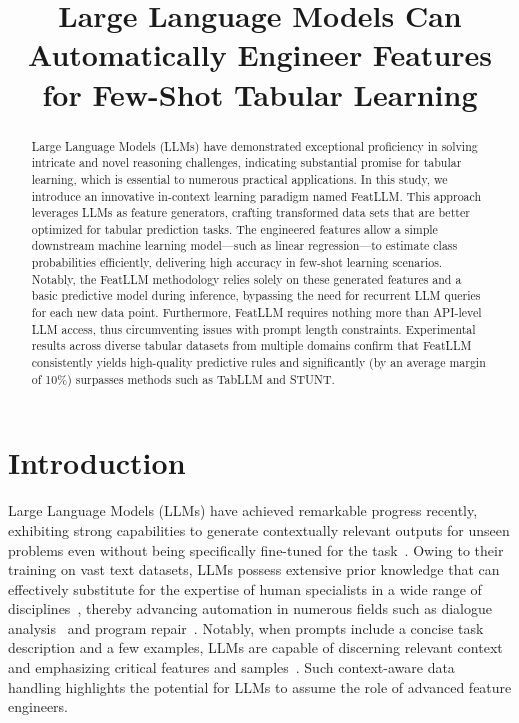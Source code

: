 \title{Large Language Models Can Automatically Engineer Features for Few-Shot Tabular Learning}

\begin{abstract}
Large Language Models (LLMs) have demonstrated exceptional proficiency in solving intricate and novel reasoning challenges, indicating substantial promise for tabular learning, which is essential to numerous practical applications. In this study, we introduce an innovative in-context learning paradigm named \textsf{FeatLLM}. This approach leverages LLMs as feature generators, crafting transformed data sets that are better optimized for tabular prediction tasks. The engineered features allow a simple downstream machine learning model—such as linear regression—to estimate class probabilities efficiently, delivering high accuracy in few-shot learning scenarios. Notably, the \textsf{FeatLLM} methodology relies solely on these generated features and a basic predictive model during inference, bypassing the need for recurrent LLM queries for each new data point. Furthermore, \textsf{FeatLLM} requires nothing more than API-level LLM access, thus circumventing issues with prompt length constraints. Experimental results across diverse tabular datasets from multiple domains confirm that \textsf{FeatLLM} consistently yields high-quality predictive rules and significantly (by an average margin of 10\%) surpasses methods such as TabLLM and STUNT.
\end{abstract}

\section{Introduction}
Large Language Models (LLMs) have achieved remarkable progress recently, exhibiting strong capabilities to generate contextually relevant outputs for unseen problems even without being specifically fine-tuned for the task~\cite{creswell2022selection,imani2023mathprompter,taylor2022galactica}. Owing to their training on vast text datasets, LLMs possess extensive prior knowledge that can effectively substitute for the expertise of human specialists in a wide range of disciplines~\cite{Genomes2021,singhal2023large,wilcox2003role}, thereby advancing automation in numerous fields such as dialogue analysis~\cite{finch2023leveraging} and program repair~\cite{fan2023automated}. Notably, when prompts include a concise task description and a few examples, LLMs are capable of discerning relevant context and emphasizing critical features and samples~\cite{brown2020language,zhao2023survey}. Such context-aware data handling highlights the potential for LLMs to assume the role of advanced feature engineers.


